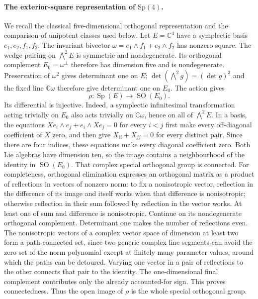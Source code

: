 \paragraph{The exterior-square representation of $\mathrm{Sp}(4)$.}
We recall the classical five-dimensional orthogonal representation and the comparison of unipotent classes used below.
Let $E=\mathbb C^4$ have a symplectic basis $e_1,e_2,f_1,f_2$.
The invariant bivector $\omega=e_1\wedge f_1+e_2\wedge f_2$ has
nonzero square. The wedge pairing on $\bigwedge^2E$ is symmetric
and nondegenerate. Its orthogonal complement
$E_0=\omega^\perp$ therefore has dimension five and is nondegenerate.
Preservation of $\omega^2$ gives determinant one on $E$;
$\det(\bigwedge^2g)=(\det g)^3$ and the fixed line
$\mathbb C\omega$ therefore give determinant one on $E_0$.
The action gives
\[
 \rho:\operatorname{Sp}(E)\longrightarrow\operatorname{SO}(E_0).
\]
Its differential is injective. Indeed, a symplectic infinitesimal
transformation acting trivially on $E_0$ also acts trivially on
$\mathbb C\omega$, hence on all of $\bigwedge^2E$. In a basis,
the equations $Xe_i\wedge e_j+e_i\wedge Xe_j=0$ for every $i<j$
first make every off-diagonal coefficient of $X$ zero, and then give
$X_{ii}+X_{jj}=0$ for every distinct pair. Since there are four
indices, these equations make every diagonal coefficient zero.
Both Lie algebras have dimension ten, so the image contains a
neighbourhood of the identity in $\operatorname{SO}(E_0)$.
That complex special orthogonal group is connected. For completeness,
orthogonal elimination expresses an orthogonal matrix as a product
of reflections in vectors of nonzero norm: to fix a nonisotropic
vector, reflection in the difference of its image and itself works
when that difference is nonisotropic; otherwise reflection in their
sum followed by reflection in the vector works. At least one of
sum and difference is nonisotropic. Continue on its nondegenerate
orthogonal complement. Determinant one makes the number of
reflections even. The nonisotropic vectors of a complex vector
space of dimension at least two form a path-connected set, since
two generic complex line segments can avoid the zero set of the
norm polynomial except at finitely many parameter values, around
which the paths can be detoured. Varying one vector in a pair of
reflections to the other connects that pair to the identity.
The one-dimensional final complement contributes only the already
accounted-for sign. This proves connectedness. Thus the open image
of $\rho$ is the whole special orthogonal group.


